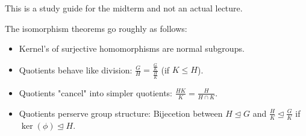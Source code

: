 This is a study guide for the midterm and not an actual lecture.
\begin{theorem}
	The isomorphism theorems go roughly as follows:
\begin{itemize}
	\item Kernel's of surjective homomorphisms are normal subgroups.
	\item Quotients behave like division: \(\frac{G}{H} = \frac{\frac{G}{K}}{\frac{H}{K}}\) (if \(K \le H\)).
		\item Quotients "cancel" into simpler quotients: \(\frac{HK}{K} = \frac{H}{H\cap K}\).
			\item Quotients perserve group structure: Bijecetion between \(H \trianglelefteq G\) and \(\frac{H}{K}\trianglelefteq \frac{G}{K}\) if \(\ker \left( \phi \right) \trianglelefteq H\).
\end{itemize}
\end{theorem}

